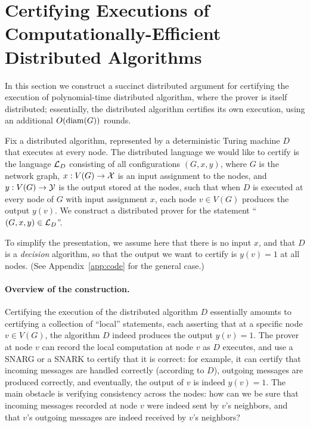 \section{Certifying Executions of Computationally-Efficient Distributed Algorithms}
\label{sec:distprover}
In this section we construct a succinct distributed argument
for certifying the execution of polynomial-time distributed algorithm,
where the prover is itself distributed;
essentially, the distributed algorithm certifies its own execution,
using an additional $O(\operatorname{diam}(G))$ rounds.


Fix a distributed algorithm, represented by a deterministic Turing machine $D$ that
executes at every node.
The distributed language we would like to certify is the language
$\mathcal{L}_D$
consisting of all configurations $(G, x, y)$,
where $G$ is the network graph, $x : V(G) \rightarrow \mathcal{X}$ is an input assignment to the nodes,
and $y : V(G) \rightarrow \mathcal{Y}$ is the output stored at the nodes,
such that when $D$ is executed at every node of $G$ with input assignment $x$,
each node $v \in V(G)$ produces the output $y(v)$.
We construct a distributed prover for the statement ``$(G,x,y) \in \mathcal{L}_D$''.

To simplify the presentation, we assume here that there is no input $x$,
and that $D$ is a \emph{decision} algorithm,
so that the output we want to certify is $y(v) = 1$ at all nodes.
(See Appendix~\ref{app:code} for the general case.)

\paragraph{Overview of the construction.}
Certifying the execution of the distributed algorithm $D$
essentially amounts to certifying a collection of ``local'' statements,
each asserting that at a specific node $v \in V(G)$,
the algorithm $D$ indeed produces the output $y(v) = 1$.
The prover at node $v$ can record the local computation at node $v$
as $D$ executes,
and use a SNARG or a SNARK
to certify that it is correct: for example, it can certify that incoming messages
are handled correctly (according to $D$),
outgoing messages are produced correctly, and eventually, the output of $v$ is indeed $y(v) = 1$.
The main obstacle is verifying consistency across the nodes:
how can we be sure that incoming messages recorded at node $v$ were indeed sent by $v$'s neighbors,
and that $v$'s outgoing messages are indeed received by $v$'s neighbors?

